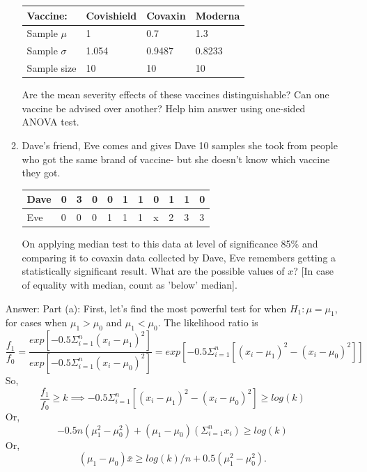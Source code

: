 \documentclass[12pt, oneside]{article}
\begin{document}
\begin{enumerate}
\begin{enumerate}
    \begin{table}[!ht]
    \centering
    \begin{tabular}{|l|l|l|l|}
    \hline
    Vaccine:        & Covishield & Covaxin & Moderna  \\ \hline
    Sample $\mu$    & 1      & 0.7     & 1.3      \\ \hline
    Sample $\sigma$ & 1.054     & 0.9487  & 0.8233    \\ \hline
    Sample size     & 10         & 10      & 10         \\ \hline
    \end{tabular}
    \end{table}
    Are the mean severity effects of these vaccines distinguishable? Can one vaccine be advised over another? Help him answer using one-sided ANOVA test.

    \item Dave's friend, Eve comes and gives Dave 10 samples she took from people who got the same brand of vaccine- but she doesn't know which vaccine they got. 
    \begin{table}[!htb]
    \centering
    \begin{tabular}{|l|l|l|l|l|l|l|l|l|l|l|}
    \hline
    Dave & 0 & 3 & 0 & 0 & 1 & 1 & 0 & 1 & 1 & 0 \\ \hline
    Eve  & 0 & 0 & 0 & 1 & 1 & 1 & x & 2 & 3 & 3 \\ \hline
    \end{tabular}
    \end{table}
    On applying median test to this data at level of significance 85\% and comparing it to covaxin data collected by Dave, Eve remembers getting a statistically significant result. What are the possible values of $x$? [In case of equality with median, count as 'below' median].
    
\end{enumerate}
Answer:
\newline Part (a): First, let's find the most powerful test for when $H_1: \mu = \mu_1$, for cases when $\mu_1 > \mu_0$ and $\mu_1 < \mu_0$.
\newline The likelihood ratio is 
$$
\dfrac{f_1}{f_0} = \dfrac{exp[-0.5\Sigma_{i=1}^{n} (x_i-\mu_1)^2]}{exp[-0.5\Sigma_{i=1}^{n} (x_i-\mu_0)^2]} = exp[-0.5\Sigma_{i=1}^{n} [(x_i-\mu_1)^2 - (x_i-\mu_0)^2]]
$$
So, $$
\dfrac{f_1}{f_0} \ge k \implies -0.5\Sigma_{i=1}^{n} [(x_i-\mu_1)^2 - (x_i-\mu_0)^2] \ge log(k) 
$$
Or, 
$$-0.5n(\mu_1^2 - \mu_0^2) + (\mu_1 - \mu_0) (\Sigma_{i=1}^{n} x_i) \ge log(k)$$
Or,
$$ (\mu_1 - \mu_0) \bar{x} \ge log(k)/n + 0.5(\mu_1^2 - \mu_0^2).$$


\end{enumerate}
\end{document}

